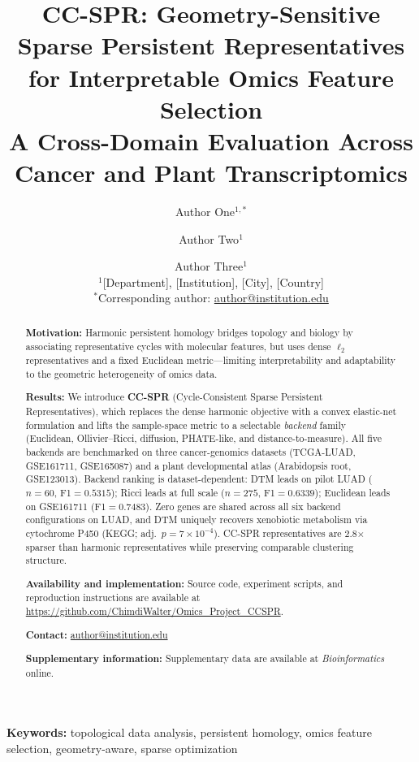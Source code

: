 \documentclass[12pt]{article}
\title{CC-SPR: Geometry-Sensitive Sparse Persistent Representatives\\
for Interpretable Omics Feature Selection\\[6pt]
\large A Cross-Domain Evaluation Across Cancer and Plant Transcriptomics}
\author{
  Author One$^{1,\ast}$ \and
  Author Two$^{1}$ \and
  Author Three$^{1}$\\[6pt]
  \small $^{1}$[Department], [Institution], [City], [Country]\\
  \small $^\ast$Corresponding author: \href{mailto:author@institution.edu}{author@institution.edu}
}
\date{}
\begin{document}
\maketitle

\begin{abstract}
\noindent\textbf{Motivation:}
Harmonic persistent homology bridges topology and biology by associating
representative cycles with molecular features, but uses dense $\ell_2$
representatives and a fixed Euclidean metric---limiting interpretability and
adaptability to the geometric heterogeneity of omics data.

\noindent\textbf{Results:}
We introduce \textbf{CC-SPR} (Cycle-Consistent Sparse Persistent
Representatives), which replaces the dense harmonic objective with a convex
elastic-net formulation and lifts the sample-space metric to a selectable
\emph{backend} family (Euclidean, Ollivier--Ricci, diffusion, PHATE-like,
and distance-to-measure).
All five backends are benchmarked on three cancer-genomics datasets
(TCGA-LUAD, GSE161711, GSE165087) and a plant developmental atlas
(Arabidopsis root, GSE123013).
Backend ranking is dataset-dependent: DTM leads on pilot LUAD ($n{=}60$,
F1${=}0.5315$); Ricci leads at full scale ($n{=}275$, F1${=}0.6339$); Euclidean
leads on GSE161711 (F1${=}0.7483$).
Zero genes are shared across all six backend configurations on LUAD, and
DTM uniquely recovers xenobiotic metabolism via cytochrome P450
(KEGG; adj.\ $p = 7{\times}10^{-4}$).
CC-SPR representatives are 2.8$\times$ sparser than harmonic representatives
while preserving comparable clustering structure.

\noindent\textbf{Availability and implementation:}
Source code, experiment scripts, and reproduction instructions are available
at \url{https://github.com/ChimdiWalter/Omics_Project_CCSPR}.

\noindent\textbf{Contact:} \href{mailto:author@institution.edu}{author@institution.edu}

\noindent\textbf{Supplementary information:} Supplementary data are available at
\textit{Bioinformatics} online.
\end{abstract}

\noindent\textbf{Keywords:} topological data analysis, persistent homology,
omics feature selection, geometry-aware, sparse optimization

\newpage
\end{document}
